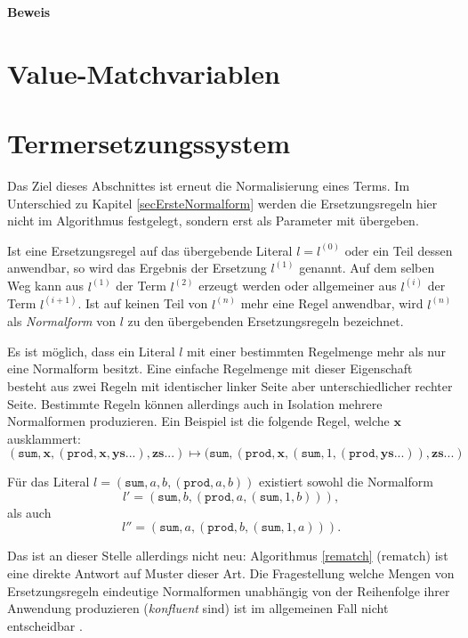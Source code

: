 \textbf{Beweis}~\\

\section{Value-Matchvariablen}




\section{Termersetzungssystem} \label{subsecTermersetzungssystem}

Das Ziel dieses Abschnittes ist erneut die Normalisierung eines Terms. Im Unterschied zu Kapitel \ref{secErsteNormalform} werden die Ersetzungsregeln hier nicht im Algorithmus festgelegt, sondern erst als Parameter mit übergeben. 

Ist eine Ersetzungsregel auf das übergebende Literal $l = l^{(0)}$ oder ein Teil dessen anwendbar, so wird das Ergebnis der Ersetzung $l^{(1)}$ genannt. Auf dem selben Weg kann aus $l^{(1)}$ der Term $l^{(2)}$ erzeugt werden oder allgemeiner aus $l^{(i)}$ der Term $l^{(i+1)}$. Ist auf keinen Teil von $l^{(n)}$ mehr eine Regel anwendbar, wird $l^{(n)}$ als \emph{Normalform} von $l$ zu den übergebenden Ersetzungsregeln bezeichnet. 

Es ist möglich, dass ein Literal $l$ mit einer bestimmten Regelmenge mehr als nur eine Normalform besitzt. Eine einfache Regelmenge mit dieser Eigenschaft besteht aus zwei Regeln mit identischer linker Seite aber unterschiedlicher rechter Seite. Bestimmte Regeln können allerdings auch in Isolation mehrere Normalformen produzieren. Ein Beispiel ist die folgende Regel, welche $\mathbf x$ ausklammert:
$$(\texttt{sum}, \mathbf x, (\texttt{prod}, \mathbf x, \mathbf{ys...}), \mathbf{zs...}) 
\mapsto (\texttt{sum}, (\texttt{prod}, \mathbf x, (\texttt{sum}, 1, (\texttt{prod}, \mathbf{ys...})) , \mathbf{zs...})$$

Für das Literal $l = (\texttt{sum}, a, b, (\texttt{prod}, a, b))$ existiert sowohl die Normalform 
$$l' = (\texttt{sum}, b, (\texttt{prod}, a, (\texttt{sum}, 1, b))),$$ 
als auch 
$$l'' = (\texttt{sum}, a, (\texttt{prod}, b, (\texttt{sum}, 1, a))).$$

Das ist an dieser Stelle allerdings nicht neu: Algorithmus \ref{rematch} ($\mathrm{rematch}$) ist eine direkte Antwort auf Muster dieser Art. Die Fragestellung welche Mengen von Ersetzungsregeln eindeutige Normalformen unabhängig von der Reihenfolge ihrer Anwendung produzieren (\emph{konfluent} sind) ist im allgemeinen Fall nicht entscheidbar \cite{KonfluenzUnentscheidbar}.



